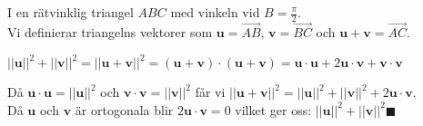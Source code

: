 I en rätvinklig triangel $ABC$ med vinkeln vid $B=\frac{\pi}{2}$.\\
Vi definierar triangelns vektorer som $\bm{u} = \overrightarrow{AB}$, $\bm{v} = \overrightarrow{BC}$ och $\bm{u}+\bm{v} = \overrightarrow{AC}$.
\begin{center}
    $||\bm{u}||^{2}+||\bm{v}||^{2}=||\bm{u}+\bm{v}||^{2}=(\bm{u}+\bm{v})\cdot (\bm{u}+\bm{v}) = \bm{u}\cdot \bm{u} + 2\bm{u}\cdot \bm{v}+\bm{v}\cdot \bm{v}$\\
\end{center}
Då $\bm{u}\cdot \bm{u}=||\bm{u}||^{2}$ och $\bm{v}\cdot \bm{v}=||\bm{v}||^{2}$ får vi $||\bm{u}+\bm{v}||^{2}=||\bm{u}||^{2}+||\bm{v}||^{2}+2\bm{u}\cdot \bm{v}$.\\
Då $\bm{u}$ och $\bm{v}$ är ortogonala blir $2\bm{u}\cdot \bm{v} = 0$ vilket ger oss: $||\bm{u}||^{2}+||\bm{v}||^{2} \blacksquare$
